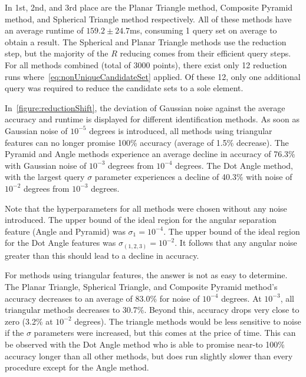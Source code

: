 In 1st, 2nd, and 3rd place are the Planar Triangle method, Composite Pyramid method, and Spherical Triangle method
respectively.
All of these methods have an average runtime of $159.2 \pm 24.7$ms, consuming 1 query set on average to obtain a result.
The Spherical and Planar Triangle methods use the  reduction step, but the majority of the $R$ reducing
comes from their efficient query steps.
For all methods combined (total of 3000 points), there exist only 12 reduction runs
where~\autoref{eq:nonUniqueCandidateSet} applied.
Of these 12, only one additional query was required to reduce the candidate sets to a sole element.

In~\autoref{figure:reductionShift}, the deviation of Gaussian noise against the average accuracy and runtime is
displayed for different identification methods.
As soon as Gaussian noise of $10^{-5}$ degrees is introduced, all methods using triangular features can no longer
promise 100\% accuracy (average of 1.5\% decrease).
The Pyramid and Angle methods experience an average decline in accuracy of 76.3\% with Gaussian noise of $10^{-3}$
degrees from $10^{-4}$ degrees.
The Dot Angle method, with the largest query $\sigma$ parameter experiences a decline of 40.3\% with noise of $10^{-2}$
degrees from $10^{-3}$ degrees.

Note that the hyperparameters for all methods were chosen without any noise introduced.
The upper bound of the ideal region for the angular separation feature (Angle and Pyramid) was $\sigma_1 = 10^{-4}$.
The upper bound of the ideal region for the Dot Angle features was $\sigma_{(1, 2, 3)} = 10^{-2}$.
It follows that any angular noise greater than this should lead to a decline in accuracy.

For methods using triangular features, the answer is not as easy to determine.
The Planar Triangle, Spherical Triangle, and Composite Pyramid method's accuracy decreases to an average of
83.0\% for noise of $10^{-4}$ degrees.
At $10^{-3}$, all triangular methods decreases to 30.7\%.
Beyond this, accuracy drops very close to zero (3.2\% at $10^{-2}$ degrees).
The triangle methods would be less sensitive to noise if the $\sigma$ parameters were increased, but this comes at the
price of time.
This can be observed with the Dot Angle method who is able to promise near-to 100\% accuracy longer than all other
methods, but does run slightly slower than every procedure except for the Angle method.

